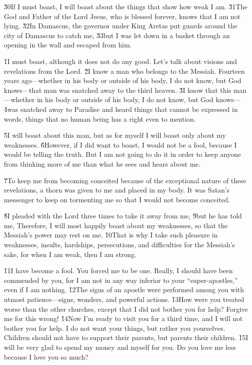 \v{30}If I must boast, I will boast about the things that show how weak I am. \v{31}The God and Father of the Lord Jesus, who is blessed forever, knows that I am not lying. \v{32}In Damascus, the governor under King Aretas put guards around the city of Damascus to catch me, \v{33}but I was let down in a basket through an opening in the wall and escaped from him.

\v{1}I must boast, although it does not do any good. Let's talk about visions and revelations from the Lord. \v{2}I know a man who belongs to the Messiah. Fourteen years ago---whether in his body or outside of his body, I do not know, but God knows---that man was snatched away to the third heaven. \v{3}I know that this man---whether in his body or outside of his body, I do not know, but God knows--- \v{4}was snatched away to Paradise and heard things that cannot be expressed in words, things that no human being has a right even to mention.

\v{5}I will boast about this man, but as for myself I will boast only about my weaknesses. \v{6}However, if I did want to boast, I would not be a fool, because I would be telling the truth. But I am not going to do it in order to keep anyone from thinking more of me than what he sees and hears about me.

\v{7}To keep me from becoming conceited because of the exceptional nature of these revelations, a thorn was given to me and placed in my body. It was Satan's messenger to keep on tormenting me so that I would not become conceited.

\v{8}I pleaded with the Lord three times to take it away from me, \v{9}but he has told me,  Therefore, I will most happily boast about my weaknesses, so that the Messiah's power may rest on me. \v{10}That is why I take such pleasure in weaknesses, insults, hardships, persecutions, and difficulties for the Messiah's sake, for when I am weak, then I am strong.

\v{11}I have become a fool. You forced me to be one. Really, I should have been commended by you, for I am not in any way inferior to your ``super-apostles,'' even if I am nothing. \v{12}The signs of an apostle were performed among you with utmost patience---signs, wonders, and powerful actions. \v{13}How were you treated worse than the other churches, except that I did not bother you for help? Forgive me for this wrong! \v{14}Now I'm ready to visit you for a third time, and I will not bother you for help. I do not want your things, but rather you yourselves. Children should not have to support their parents, but parents their children. \v{15}I will be very glad to spend my money and myself for you. Do you love me less because I love you so much?

